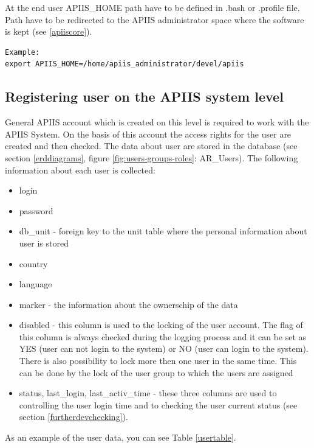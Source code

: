 At the end user APIIS\_HOME path have to be defined in .bash or .profile file. Path have to be redirected to the APIIS administrator space where the software is kept (see \ref{apiiscore}).
\begin{verbatim}
Example:
export APIIS_HOME=/home/apiis_administrator/devel/apiis
\end{verbatim} 

\subsection{Registering user on the APIIS system level \label{registeringuseronAPIISL}}
General APIIS account which is created on this level is required to work with the APIIS System. On the basis of this account the access rights for the user are created and then checked. The data about user are stored in the database (see section \ref{erddiagrams}, figure \ref{fig:users-groups-roles}: AR\_Users). The following information about each user is collected:
\begin{itemize}
\item login
\item password
\item db\_unit - foreign key to the unit table where the personal information about user is stored
\item country
\item language
\item marker - the information about the ownerschip of the data
\item disabled - this column is used to the locking of the user account. The flag of this column is always checked during the logging process and it can be set as YES (user can not login to the system) or NO (user can login to the system). There is also possibility to lock more then one user in the same time. This can be done by the lock of the user group to which the users are assigned
\item status, last\_login, last\_activ\_time - these three columns are used to controlling the user login time and to checking the user current status (see section \ref{furtherdevchecking}).
\end{itemize}

As an example of the user data, you can see Table \ref{usertable}.\\
\newpage 

